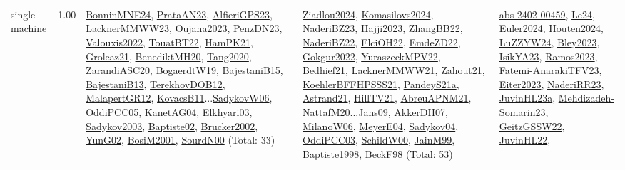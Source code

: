 {\begin{longtable}{p{3cm}r>{\raggedright\arraybackslash}p{6cm}>{\raggedright\arraybackslash}p{6cm}>{\raggedright\arraybackslash}p{8cm}}
\index{single machine}\index{Classification!single machine}single machine &  1.00 & \hyperref[detail:BonninMNE24]{BonninMNE24}, \hyperref[detail:PrataAN23]{PrataAN23}, \hyperref[detail:AlfieriGPS23]{AlfieriGPS23}, \hyperref[detail:LacknerMMWW23]{LacknerMMWW23}, \hyperref[detail:Oujana2023]{Oujana2023}, \hyperref[detail:PenzDN23]{PenzDN23}, \hyperref[detail:Valouxis2022]{Valouxis2022}, \hyperref[detail:TouatBT22]{TouatBT22}, \hyperref[detail:HamPK21]{HamPK21}, \hyperref[detail:Groleaz21]{Groleaz21}, \hyperref[detail:BenediktMH20]{BenediktMH20}, \hyperref[detail:Tang2020]{Tang2020}, \hyperref[detail:ZarandiASC20]{ZarandiASC20}, \hyperref[detail:BogaerdtW19]{BogaerdtW19}, \hyperref[detail:BajestaniB15]{BajestaniB15}, \hyperref[detail:BajestaniB13]{BajestaniB13}, \hyperref[detail:TerekhovDOB12]{TerekhovDOB12}, \hyperref[detail:MalapertGR12]{MalapertGR12}, \hyperref[detail:KovacsB11]{KovacsB11}...\hyperref[detail:SadykovW06]{SadykovW06}, \hyperref[detail:OddiPCC05]{OddiPCC05}, \hyperref[detail:KanetAG04]{KanetAG04}, \hyperref[detail:Elkhyari03]{Elkhyari03}, \hyperref[detail:Sadykov2003]{Sadykov2003}, \hyperref[detail:Baptiste02]{Baptiste02}, \hyperref[detail:Brucker2002]{Brucker2002}, \hyperref[detail:YunG02]{YunG02}, \hyperref[detail:BosiM2001]{BosiM2001}, \hyperref[detail:SourdN00]{SourdN00} (Total: 33) & \hyperref[detail:Ziadlou2024]{Ziadlou2024}, \hyperref[detail:Komasilovs2024]{Komasilovs2024}, \hyperref[detail:NaderiBZ23]{NaderiBZ23}, \hyperref[detail:Hajji2023]{Hajji2023}, \hyperref[detail:ZhangBB22]{ZhangBB22}, \hyperref[detail:NaderiBZ22]{NaderiBZ22}, \hyperref[detail:ElciOH22]{ElciOH22}, \hyperref[detail:EmdeZD22]{EmdeZD22}, \hyperref[detail:Gokgur2022]{Gokgur2022}, \hyperref[detail:YuraszeckMPV22]{YuraszeckMPV22}, \hyperref[detail:Bedhief21]{Bedhief21}, \hyperref[detail:LacknerMMWW21]{LacknerMMWW21}, \hyperref[detail:Zahout21]{Zahout21}, \hyperref[detail:KoehlerBFFHPSSS21]{KoehlerBFFHPSSS21}, \hyperref[detail:PandeyS21a]{PandeyS21a}, \hyperref[detail:Astrand21]{Astrand21}, \hyperref[detail:HillTV21]{HillTV21}, \hyperref[detail:AbreuAPNM21]{AbreuAPNM21}, \hyperref[detail:NattafM20]{NattafM20}...\hyperref[detail:Jans09]{Jans09}, \hyperref[detail:AkkerDH07]{AkkerDH07}, \hyperref[detail:MilanoW06]{MilanoW06}, \hyperref[detail:MeyerE04]{MeyerE04}, \hyperref[detail:Sadykov04]{Sadykov04}, \hyperref[detail:OddiPCC03]{OddiPCC03}, \hyperref[detail:SchildW00]{SchildW00}, \hyperref[detail:JainM99]{JainM99}, \hyperref[detail:Baptiste1998]{Baptiste1998}, \hyperref[detail:BeckF98]{BeckF98} (Total: 53) & \hyperref[detail:abs-2402-00459]{abs-2402-00459}, \hyperref[detail:Le24]{Le24}, \hyperref[detail:Euler2024]{Euler2024}, \hyperref[detail:Houten2024]{Houten2024}, \hyperref[detail:LuZZYW24]{LuZZYW24}, \hyperref[detail:Bley2023]{Bley2023}, \hyperref[detail:IsikYA23]{IsikYA23}, \hyperref[detail:Ramos2023]{Ramos2023}, \hyperref[detail:Fatemi-AnarakiTFV23]{Fatemi-AnarakiTFV23}, \hyperref[detail:Eiter2023]{Eiter2023}, \hyperref[detail:NaderiRR23]{NaderiRR23}, \hyperref[detail:JuvinHL23a]{JuvinHL23a}, \hyperref[detail:Mehdizadeh-Somarin23]{Mehdizadeh-Somarin23}, \hyperref[detail:GeitzGSSW22]{GeitzGSSW22}, \hyperref[detail:JuvinHL22]{JuvinHL22}, 
\end{longtable}}
